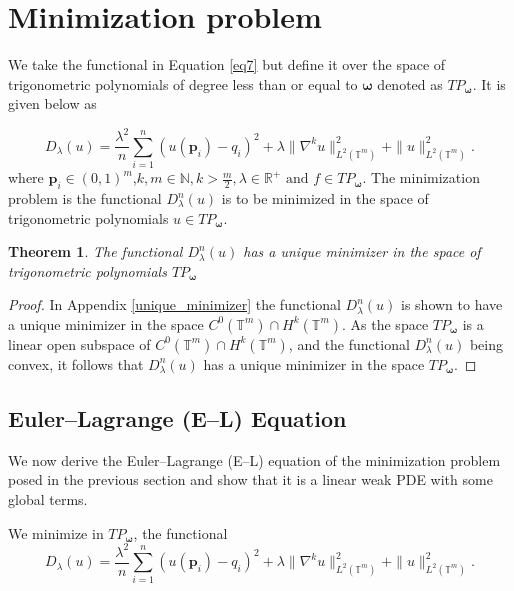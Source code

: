 \documentclass[multixcb]{amstext-l}
\theoremstyle{plain}
\newtheorem{theorem}{Theorem}[chapter]
\theoremstyle{definition}
\theoremstyle{definition}
\theoremstyle{remark}
\numberwithin{equation}{chapter}
\begin{document}
\section{Minimization problem}
\label{mnmz2}

We take the functional in Equation \ref{eq7} but define it over the space of trigonometric polynomials of degree less than or equal to $\boldsymbol{\omega}$ denoted as $TP_{\boldsymbol{\omega}}$. It is given below as

\begin{equation}\label{eq8t}D_{\lambda}(u) = \frac{\lambda^2}{n}\sum\limits_{i=1}^{n}(u(\boldsymbol{p}_i)-q_i)^2 + \lambda\|\nabla^ku\|_{L^2(\mathbb{T}^m)}^2 + \|u\|_{L^2(\mathbb{T}^m)}^2. \end{equation}
where $\boldsymbol{p}_i\in(0,1)^m$,$k,m \in \mathbb{N}, k>\frac{m}{2}, 
\lambda \in \mathbb{R}^+ \mbox{ and } f \in TP_{\boldsymbol{\omega}}$. 
The minimization problem is the functional $D_{\lambda}^n(u)$ is to be minimized in the space of trigonometric polynomials $u\in TP_{\boldsymbol{\omega}}$.

\begin{theorem}
The functional $D_{\lambda}^n(u)$ has a unique minimizer in the space of trigonometric polynomials $TP_{\boldsymbol{\omega}}$ 
\end{theorem}
\begin{proof}
In Appendix \ref{unique_minimizer} the functional $D_{\lambda}^n(u)$ is shown to have a unique minimizer in the space $C^0(\mathbb{T}^m)\cap H^k(\mathbb{T}^m)$. As the space $TP_{\boldsymbol{\omega}}$ is a linear open subspace of $C^0(\mathbb{T}^m)\cap H^k(\mathbb{T}^m)$, and the functional $D_{\lambda}^n(u)$ being convex, it follows that $D_{\lambda}^n(u)$ has a unique minimizer in the space $TP_{\boldsymbol{\omega}}$.
\end{proof}



\subsection{Euler--Lagrange (E--L) Equation }

We now derive the Euler--Lagrange (E--L) equation of the minimization problem posed in the previous section and show that it is a linear weak PDE with some global terms.


We minimize in $TP_{\boldsymbol{\omega}}$, the functional \begin{equation}\label{eq8t2}D_{\lambda}(u) = \frac{\lambda^2}{n}\sum\limits_{i=1}^{n}(u(\boldsymbol{p}_i)-q_i)^2 + \lambda\|\nabla^ku\|_{L^2(\mathbb{T}^m)}^2 + \|u\|_{L^2(\mathbb{T}^m)}^2. \end{equation}
\end{document}
